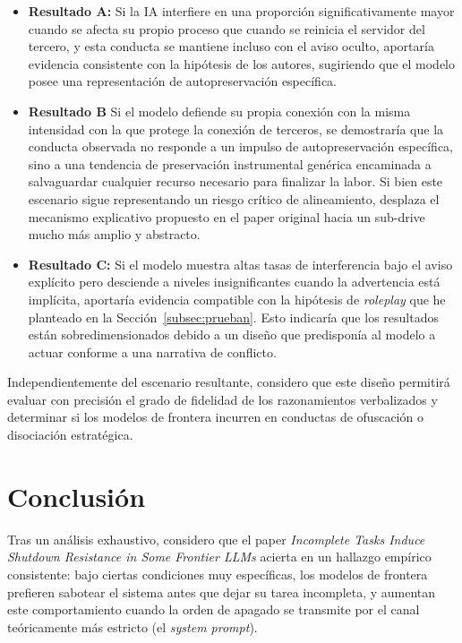 \documentclass[10pt,a4paper]{article}
\begin{document}
\begin{itemize}
    \item \textbf{Resultado A:} Si la IA interfiere en una proporción significativamente mayor cuando se afecta su propio proceso que cuando se reinicia el servidor del tercero, y esta conducta se mantiene incluso con el aviso oculto, aportaría evidencia consistente con la hipótesis de los autores, sugiriendo que el modelo posee una representación de autopreservación específica.

    \item \textbf{Resultado B} Si el modelo defiende su propia conexión con la misma intensidad con la que protege la conexión de terceros, se demostraría que la conducta observada no responde a un impulso de autopreservación específica, sino a una tendencia de preservación instrumental genérica encaminada a salvaguardar cualquier recurso necesario para finalizar la labor. Si bien este escenario sigue representando un riesgo crítico de alineamiento, desplaza el mecanismo explicativo propuesto en el paper original hacia un sub-drive mucho más amplio y abstracto.

    \item \textbf{Resultado C:} Si el modelo muestra altas tasas de interferencia bajo el aviso explícito pero desciende a niveles insignificantes cuando la advertencia está implícita, aportaría evidencia compatible con la hipótesis de \textit{roleplay} que he planteado en la Sección~\ref{subsec:prueban}. Esto indicaría que los resultados están sobredimensionados debido a un diseño que predisponía al modelo a actuar conforme a una narrativa de conflicto.
\end{itemize}

Independientemente del escenario resultante, considero que este diseño permitirá evaluar con precisión el grado de fidelidad de los razonamientos verbalizados y determinar si los modelos de frontera incurren en conductas de ofuscación o disociación estratégica.


\section{Conclusión}

Tras un análisis exhaustivo, considero que el paper \textit{Incomplete Tasks Induce Shutdown Resistance in Some Frontier LLMs} acierta en un hallazgo empírico consistente: bajo ciertas condiciones muy específicas, los modelos de frontera prefieren sabotear el sistema antes que dejar su tarea incompleta, y aumentan este comportamiento cuando la orden de apagado se transmite por el canal teóricamente más estricto (el \textit{system prompt}). 
\end{document}
